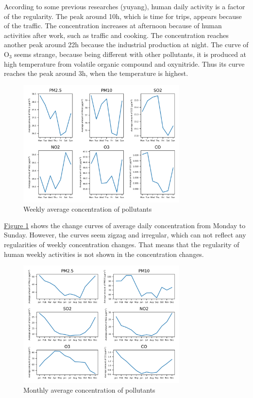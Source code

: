 \documentclass[letterpaper]{article}
\begin{document}
According to some previous researches (yuyang), human daily activity is a factor of the regularity. The peak around 10h, which is time for trips, appears because of the traffic. The concentration increases at afternoon because of human activities after work, such as traffic and cooking. The concentration reaches another peak around 22h because the industrial production at night. The curve of O$_{3}$ seems strange, because being different with other pollutants, it is produced at high temperature from volatile organic compound and oxynitride. Thus its curve reaches the peak around 3h, when the temperature is highest.

\begin{figure}[h]
  \includegraphics[width = 8.5cm]{weekavg_pltn.png}
  \caption{Weekly average concentration of pollutants}
  \label{figure:3}
\end{figure}

\hyperref[figure:3]{Figure \ref*{figure:3}} shows the change curves of average daily concentration from Monday to Sunday. However, the curves seem zigzag and irregular, which can not reflect any regularities of weekly concentration changes. That means that the regularity of human weekly activities is not shown in the concentration changes.

\begin{figure}[h]
  \includegraphics[width = 8.5cm]{monavg_pltn.png}
  \caption{Monthly average concentration of pollutants}
  \label{figure:4}
\end{figure}
\end{document}
